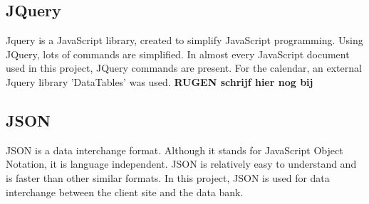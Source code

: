 \subsection{JQuery}
Jquery is a JavaScript library, created to simplify JavaScript programming. Using JQuery, lots of commands are simplified. In almost every JavaScript document used in this project, JQuery commands are present. 
For the calendar, an external Jquery library 'DataTables' was used. 
\textbf{RUGEN schrijf hier nog bij}

\subsection{JSON}
JSON is a data interchange format. Although it stands for JavaScript Object Notation, it is language independent. JSON is relatively easy to understand and is faster than other similar formats. In this project, JSON is used for data interchange between the client site and the data bank. 
